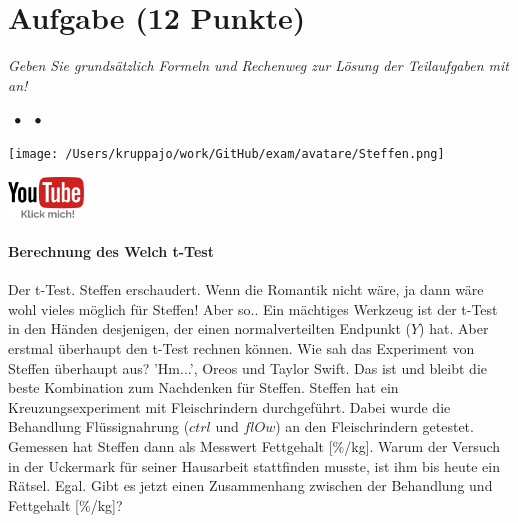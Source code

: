 \documentclass[a4paper, 9pt]{scrartcl}\usepackage[]{graphicx}\usepackage[]{xcolor}
\begin{document}
\section{Aufgabe \hfill (12 Punkte)}

\textit{Geben Sie grundsätzlich Formeln und Rechenweg zur Lösung der Teilaufgaben mit an!} \\[1Ex]
 

 
\ifcollection
\begin{flushright}
\tiny\vspace{-3Ex}
\textbf{\examinhaltstart}
\exammodulemathstat $\;\bullet$
\exammodulestat $\;\bullet$
\exammodulestatbbv 
\vspace{-4Ex}
\end{flushright}
\begin{minipage}[t]{0.5\textwidth}
\texttt{[image: /Users/kruppajo/work/GitHub/exam/avatare/Steffen.png]}
\end{minipage}
\begin{minipage}[t]{0.5\textwidth}
\hfill
\href{https://youtu.be/uQDOuSlHaqw}{\includegraphics[width = 2cm]{img/youtube}}
\end{minipage}
\vspace{-3ex}
\fi



\ifcollection
\paragraph{Berechnung des Welch t-Test}
\fi


Der t-Test. Steffen erschaudert. Wenn die Romantik nicht wäre, ja dann wäre wohl vieles möglich für Steffen! Aber so.. Ein mächtiges Werkzeug ist der t-Test in den Händen desjenigen, der einen normalverteilten Endpunkt ($Y$) hat. Aber erstmal überhaupt den t-Test rechnen können. Wie sah das Experiment von Steffen überhaupt aus? 'Hm...', Oreos und Taylor Swift. Das ist und bleibt die beste Kombination zum Nachdenken für Steffen. Steffen hat ein Kreuzungsexperiment mit Fleischrindern durchgeführt. Dabei wurde die Behandlung Flüssignahrung ($ctrl$ und $flOw$) an den Fleischrindern getestet. Gemessen hat Steffen dann als Messwert Fettgehalt [\%/kg]. Warum der Versuch in der Uckermark für seiner Hausarbeit stattfinden musste, ist ihm bis heute ein Rätsel. Egal. Gibt es jetzt einen Zusammenhang zwischen der Behandlung und Fettgehalt [\%/kg]?
\end{document}
